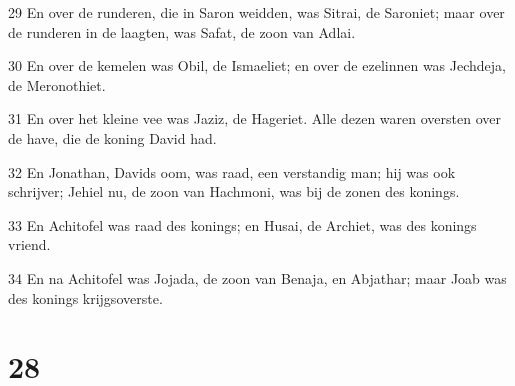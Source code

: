 \par 29 En over de runderen, die in Saron weidden, was Sitrai, de Saroniet; maar over de runderen in de laagten, was Safat, de zoon van Adlai.
\par 30 En over de kemelen was Obil, de Ismaeliet; en over de ezelinnen was Jechdeja, de Meronothiet.
\par 31 En over het kleine vee was Jaziz, de Hageriet. Alle dezen waren oversten over de have, die de koning David had.
\par 32 En Jonathan, Davids oom, was raad, een verstandig man; hij was ook schrijver; Jehiel nu, de zoon van Hachmoni, was bij de zonen des konings.
\par 33 En Achitofel was raad des konings; en Husai, de Archiet, was des konings vriend.
\par 34 En na Achitofel was Jojada, de zoon van Benaja, en Abjathar; maar Joab was des konings krijgsoverste.

\chapter{28}

